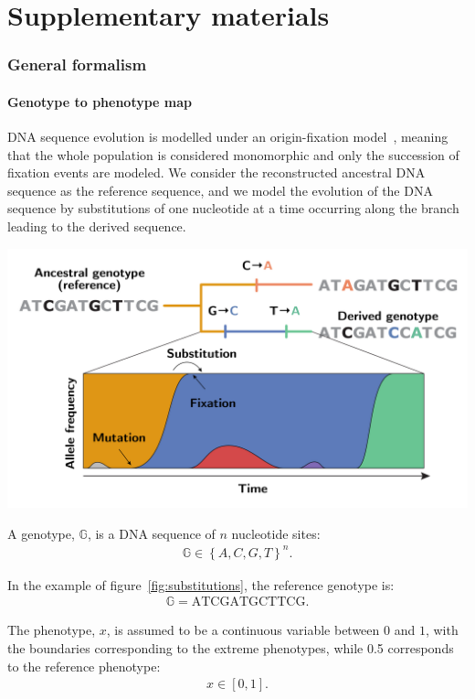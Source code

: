 \documentclass{article}
\newcommand{\NbrSites}{n}
\newcommand{\Geno}{\mathbb{G}}
\newcommand{\PhenoDef}{x}
\begin{document}
    \part*{Supplementary materials}
    \tableofcontents
    \newpage


    \section{General formalism}\label{sec:general-formalism}

    \subsection{Genotype to phenotype map}\label{subsec:genotype-to-phenotype-map}
    DNA sequence evolution is modelled under an origin-fixation model~\cite{mccandlish_modeling_2014}, meaning that the whole population is considered monomorphic and only the succession of fixation events are modeled.
    We consider the reconstructed ancestral DNA sequence as the reference sequence, and we model the evolution of the DNA sequence by substitutions of one nucleotide at a time occurring along the branch leading to the derived sequence.
    \begin{center}
        \includegraphics[width=0.6\linewidth, page=1]{substitutions.pdf}
        \label{fig:substitutions}
    \end{center}

    A genotype, $\Geno$, is a DNA sequence of $\NbrSites$ nucleotide sites:
    \begin{align}
        \Geno \in \left\{ A, C, G, T \right\}^{\NbrSites}.
    \end{align}

    In the example of figure~\ref{fig:substitutions}, the reference genotype is:
    \begin{align*}
        \Geno = \text{ATCGATGCTTCG}.
    \end{align*}

    The phenotype, $\PhenoDef$, is assumed to be a continuous variable between $0$ and $1$, with the boundaries corresponding to the extreme phenotypes, while 0.5 corresponds to the reference phenotype:
    \begin{align}
        \PhenoDef \in \left[ 0, 1 \right].
    \end{align}
\end{document}
